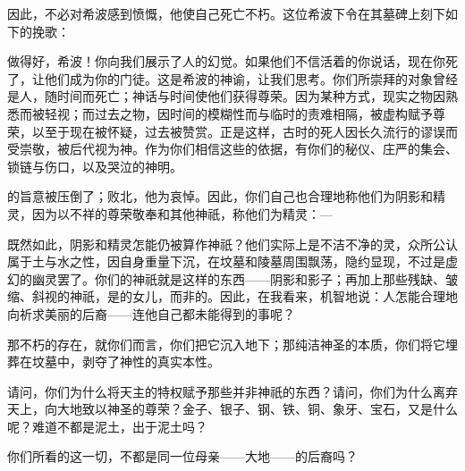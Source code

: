 因此，不必对希波感到愤慨，他使自己死亡不朽。这位希波下令在其墓碑上刻下如下的挽歌：\par

\par

做得好，希波！你向我们展示了人的幻觉。如果他们不信活着的你说话，现在你死了，让他们成为你的门徒。这是希波的神谕，让我们思考。你们所崇拜的对象曾经是人，随时间而死亡；神话与时间使他们获得尊荣。因为某种方式，现实之物因熟悉而被轻视；而过去之物，因时间的模糊性而与临时的责难相隔，被虚构赋予尊荣，以至于现在被怀疑，过去被赞赏。正是这样，古时的死人因长久流行的谬误而受崇敬，被后代视为神。作为你们相信这些的依据，有你们的秘仪、庄严的集会、锁链与伤口，以及哭泣的神明。\par

\par

的旨意被压倒了；败北，他为哀悼。因此，你们自己也合理地称他们为阴影和精灵，因为以不祥的尊荣敬奉和其他神祇，称他们为精灵：—\par

\par

既然如此，阴影和精灵怎能仍被算作神祇？他们实际上是不洁不净的灵，众所公认属于土与水之性，因自身重量下沉，在坟墓和陵墓周围飘荡，隐约显现，不过是虚幻的幽灵罢了。你们的神祇就是这样的东西——阴影和影子；再加上那些残缺、皱缩、斜视的神祇，是的女儿，而非的。因此，在我看来，机智地说：人怎能合理地向祈求美丽的后裔——连他自己都未能得到的事呢？\par

那不朽的存在，就你们而言，你们把它沉入地下；那纯洁神圣的本质，你们将它埋葬在坟墓中，剥夺了神性的真实本性。\par

请问，你们为什么将天主的特权赋予那些并非神祇的东西？请问，你们为什么离弃天上，向大地致以神圣的尊荣？金子、银子、钢、铁、铜、象牙、宝石，又是什么呢？难道不都是泥土，出于泥土吗？\par

你们所看的这一切，不都是同一位母亲——大地——的后裔吗？\par

